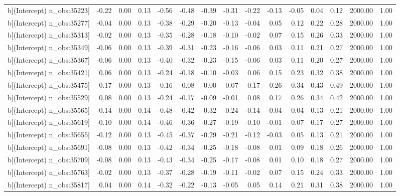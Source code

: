 \begin{table}[ht]
\begin{tabular}{rrrrrrrrrrrrrrr}
  b[(Intercept) n\_obs:35223] & -0.22 & 0.00 & 0.13 & -0.56 & -0.48 & -0.39 & -0.31 & -0.22 & -0.13 & -0.05 & 0.04 & 0.12 & 2000.00 & 1.00 \\ 
  b[(Intercept) n\_obs:35277] & -0.04 & 0.00 & 0.13 & -0.38 & -0.29 & -0.20 & -0.13 & -0.04 & 0.05 & 0.12 & 0.22 & 0.28 & 2000.00 & 1.00 \\ 
  b[(Intercept) n\_obs:35313] & -0.02 & 0.00 & 0.13 & -0.35 & -0.28 & -0.18 & -0.10 & -0.02 & 0.07 & 0.15 & 0.26 & 0.33 & 2000.00 & 1.00 \\ 
  b[(Intercept) n\_obs:35349] & -0.06 & 0.00 & 0.13 & -0.39 & -0.31 & -0.23 & -0.16 & -0.06 & 0.03 & 0.11 & 0.21 & 0.27 & 2000.00 & 1.00 \\ 
  b[(Intercept) n\_obs:35367] & -0.06 & 0.00 & 0.13 & -0.40 & -0.32 & -0.23 & -0.15 & -0.06 & 0.03 & 0.11 & 0.20 & 0.27 & 2000.00 & 1.00 \\ 
  b[(Intercept) n\_obs:35421] & 0.06 & 0.00 & 0.13 & -0.24 & -0.18 & -0.10 & -0.03 & 0.06 & 0.15 & 0.23 & 0.32 & 0.38 & 2000.00 & 1.00 \\ 
  b[(Intercept) n\_obs:35475] & 0.17 & 0.00 & 0.13 & -0.16 & -0.08 & -0.00 & 0.07 & 0.17 & 0.26 & 0.34 & 0.43 & 0.49 & 2000.00 & 1.00 \\ 
  b[(Intercept) n\_obs:35529] & 0.08 & 0.00 & 0.13 & -0.24 & -0.17 & -0.09 & -0.01 & 0.08 & 0.17 & 0.26 & 0.34 & 0.42 & 2000.00 & 1.00 \\ 
  b[(Intercept) n\_obs:35565] & -0.14 & 0.00 & 0.14 & -0.48 & -0.42 & -0.32 & -0.24 & -0.14 & -0.04 & 0.04 & 0.13 & 0.21 & 2000.00 & 1.00 \\ 
  b[(Intercept) n\_obs:35619] & -0.10 & 0.00 & 0.14 & -0.46 & -0.36 & -0.27 & -0.19 & -0.10 & -0.01 & 0.07 & 0.17 & 0.27 & 2000.00 & 1.00 \\ 
  b[(Intercept) n\_obs:35655] & -0.12 & 0.00 & 0.13 & -0.45 & -0.37 & -0.29 & -0.21 & -0.12 & -0.03 & 0.05 & 0.13 & 0.21 & 2000.00 & 1.00 \\ 
  b[(Intercept) n\_obs:35691] & -0.08 & 0.00 & 0.13 & -0.42 & -0.34 & -0.25 & -0.18 & -0.08 & 0.01 & 0.09 & 0.18 & 0.26 & 2000.00 & 1.00 \\ 
  b[(Intercept) n\_obs:35709] & -0.08 & 0.00 & 0.13 & -0.43 & -0.34 & -0.25 & -0.17 & -0.08 & 0.01 & 0.10 & 0.18 & 0.27 & 2000.00 & 1.00 \\ 
  b[(Intercept) n\_obs:35763] & -0.02 & 0.00 & 0.13 & -0.37 & -0.28 & -0.19 & -0.11 & -0.02 & 0.07 & 0.15 & 0.24 & 0.33 & 2000.00 & 1.00 \\ 
  b[(Intercept) n\_obs:35817] & 0.04 & 0.00 & 0.14 & -0.32 & -0.22 & -0.13 & -0.05 & 0.05 & 0.14 & 0.21 & 0.31 & 0.38 & 2000.00 & 1.00 \\ 

\end{tabular}
\end{table}
